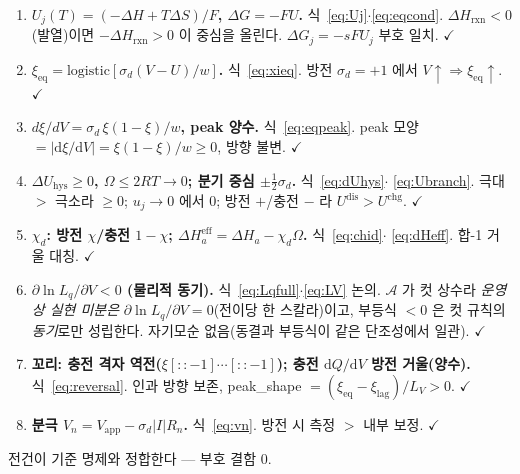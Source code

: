 \documentclass[11pt,a4paper]{article}
\newcommand{\dd}{\mathrm{d}}
\newcommand{\eff}{\mathrm{eff}}
\newcommand{\eq}{\mathrm{eq}}
\newcommand{\app}{\mathrm{app}}
\newcommand{\rxn}{\mathrm{rxn}}
\newcommand{\dis}{\mathrm{dis}}
\newcommand{\chg}{\mathrm{chg}}
\newcommand{\hys}{\mathrm{hys}}
\begin{document}
\begin{enumerate}[label=\textbf{S\arabic*.},leftmargin=2.6em,itemsep=2pt]
\item \textbf{$U_j(T)=(-\Delta H+T\Delta S)/F$, $\Delta G=-FU$.} 식~\eqref{eq:Uj}$\cdot$\eqref{eq:eqcond}. $\Delta H_\rxn<0$
(발열)이면 $-\Delta H_\rxn>0$ 이 중심을 올린다. $\Delta G_j=-sFU_j$ 부호 일치. $\checkmark$
\item \textbf{$\xi_\eq=\mathrm{logistic}[\sigma_d(V-U)/w]$.} 식~\eqref{eq:xieq}. 방전 $\sigma_d=+1$ 에서
$V\!\uparrow\Rightarrow\xi_\eq\!\uparrow$. $\checkmark$
\item \textbf{$d\xi/dV=\sigma_d\,\xi(1-\xi)/w$, peak 양수.} 식~\eqref{eq:eqpeak}. peak 모양 $=|\dd\xi/\dd V|=
\xi(1-\xi)/w\ge0$, 방향 불변. $\checkmark$
\item \textbf{$\Delta U_\hys\ge0$, $\Omega\le2RT\to0$; 분기 중심 $\pm\tfrac12\sigma_d$.} 식~\eqref{eq:dUhys}$\cdot$
\eqref{eq:Ubranch}. 극대 $>$ 극소라 $\ge0$; $u_j\to0$ 에서 $0$; 방전 $+$/충전 $-$ 라 $U^{\dis}>U^{\chg}$. $\checkmark$
\item \textbf{$\chi_d$: 방전 $\chi$/충전 $1-\chi$; $\Delta H_a^\eff=\Delta H_a-\chi_d\Omega$.} 식~\eqref{eq:chid}$\cdot$
\eqref{eq:dHeff}. 합-1 거울 대칭. $\checkmark$
\item \textbf{$\partial\ln L_q/\partial V<0$ (물리적 동기).} 식~\eqref{eq:Lqfull}$\cdot$\eqref{eq:LV} 논의. $\mathcal A$ 가
컷 상수라 \emph{운영상 실현 미분은} $\partial\ln L_q/\partial V=0$(전이당 한 스칼라)이고, 부등식 $<0$ 은 컷 규칙의
\emph{동기}로만 성립한다. 자기모순 없음(동결과 부등식이 같은 단조성에서 일관). $\checkmark$
\item \textbf{꼬리: 충전 격자 역전($\xi[::-1]\cdots[::-1]$); 충전 $\dd Q/\dd V$ 방전 거울(양수).} 식~\eqref{eq:reversal}.
인과 방향 보존, peak\_shape $=(\xi_\eq-\xi_\mathrm{lag})/L_V>0$. $\checkmark$
\item \textbf{분극 $V_n=V_\app-\sigma_d|I|R_n$.} 식~\eqref{eq:vn}. 방전 시 측정 $>$ 내부 보정. $\checkmark$
\end{enumerate}
전건이 기준 명제와 정합한다 — 부호 결함 $0$.
\end{document}
